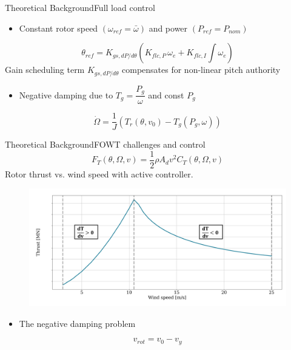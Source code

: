 \begin{frame}{Theoretical Background}{Full load control}
	\begin{itemize}
		\item Constant rotor speed $( \omega_{ref} = \bar \omega )$ and power $( P_{ref} = P_{nom} )$
	\end{itemize}
	\begin{equation}\label{eq:pi_flc_ctrl}
		\theta_{ref} = K_{gs,dP/d\theta} \left(K_{flc,P} \, \omega_e + K_{flc,I} \int \omega_e\right)
	\end{equation}
	Gain scheduling term $ K_{gs,dP/d\theta} $ compensates for non-linear pitch authority
	
	\begin{itemize}
		\item Negative damping due to $ T_g = \dfrac{P_g}{\omega} $ and const $ P_g $
	\end{itemize}
	\begin{equation}\label{eq:rotor_speed_deriv_2}
		\dot{\Omega} = \dfrac{1}{J} \left( T_r(\theta, v_0) - T_g(P_g, \omega) \right)
	\end{equation}
\end{frame}


\begin{frame}{Theoretical Background}{FOWT challenges and control}
	\begin{equation} \label{eq:aero_thrust}
		F_T(\theta, \Omega, v) = \dfrac{1}{2} \rho A_d v^2 C_T(\theta, \Omega, v)
	\end{equation}
	Rotor thrust vs. wind speed with active controller.
	\begin{figure}[ht]
		\centering
		\includegraphics[width=0.85\linewidth]{../Graphics/ThrustWindpeedCurve.PNG}
		\label{fig:thrust_vs_windspeed}
	\end{figure}

	\begin{itemize}
		\item The negative damping problem
	\end{itemize}
	\begin{equation}\label{eq:vrot}
		v_{rot} = v_0 - v_y
	\end{equation}
\end{frame}

